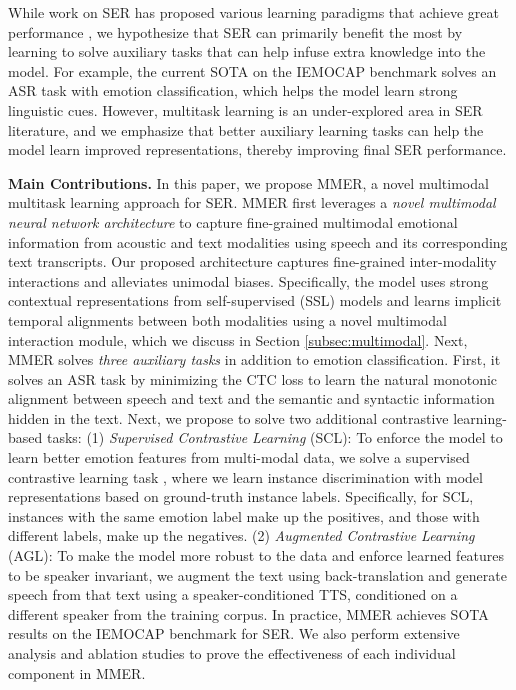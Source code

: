 \documentclass{INTERSPEECH2023}
\begin{document}
While work on SER has proposed various learning paradigms that achieve great performance \cite{cai2021speech}, we hypothesize that SER can primarily benefit the most by learning to solve auxiliary tasks that can help infuse extra knowledge into the model. For example, the current SOTA on the IEMOCAP benchmark \cite{busso2008iemocap} solves an ASR task with emotion classification, which helps the model learn strong linguistic cues. However, multitask learning is an under-explored area in SER literature, and we emphasize that better auxiliary learning tasks can help the model learn improved representations, thereby improving final SER performance.
\vspace{1mm}

{\noindent \textbf{Main Contributions.}} In this paper, we propose MMER, a novel multimodal multitask learning approach for SER. MMER first leverages a \textit{novel multimodal neural network architecture} to capture fine-grained multimodal emotional information from acoustic and text modalities using speech and its corresponding text transcripts. Our proposed architecture captures fine-grained inter-modality interactions and alleviates unimodal biases. Specifically, the model uses strong contextual representations from self-supervised (SSL) models and learns implicit temporal alignments between both modalities using a novel multimodal interaction module, which we discuss in Section \ref{subsec:multimodal}. Next, MMER solves \textit{three auxiliary tasks} in addition to emotion classification. First, it solves an ASR task by minimizing the CTC loss \cite{graves2006connectionist} to learn the natural monotonic alignment between speech and text and the semantic and syntactic information hidden in the text. Next, we propose to solve two additional contrastive learning-based tasks: (1) \textit{Supervised Contrastive Learning} (SCL): To enforce the model to learn better emotion features from multi-modal data, we solve a supervised contrastive learning task \cite{khosla2020supervised}, where we learn instance discrimination with model representations based on ground-truth instance labels. Specifically, for SCL, instances with the same emotion label make up the positives, and those with different labels, make up the negatives. (2) \textit{Augmented Contrastive Learning} (AGL): To make the model more robust to the data and enforce learned features to be speaker invariant, we augment the text using back-translation and generate speech from that text using a speaker-conditioned TTS, conditioned on a different speaker from the training corpus. In practice, MMER achieves SOTA results on the IEMOCAP benchmark for SER. We also perform extensive analysis and ablation studies to prove the effectiveness of each individual component in MMER.
\end{document}
